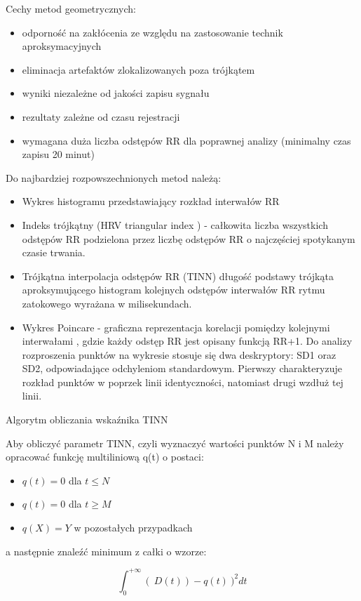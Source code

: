 \documentclass[a4paper, 11pt]{article}
\begin{document}
Cechy metod geometrycznych: 
\begin{itemize}
\item odporność na zakłócenia ze względu na zastosowanie technik aproksymacyjnych
\item eliminacja artefaktów zlokalizowanych poza trójkątem 
\item wyniki niezależne od jakości zapisu sygnału 
\item rezultaty zależne od czasu rejestracji 
\item wymagana duża liczba odstępów RR dla poprawnej analizy (minimalny
czas zapisu \textendash{} 20 minut) 
\end{itemize}
Do najbardziej rozpowszechnionych metod należą: 
\begin{itemize}
\item Wykres histogramu przedstawiający rozkład interwałów RR
\item Indeks trójkątny (HRV triangular index ) - całkowita liczba wszystkich
odstępów RR podzielona przez liczbę odstępów RR o najczęściej spotykanym
czasie trwania. 
\item Trójkątna interpolacja odstępów RR (TINN) \textendash{} długość podstawy
trójkąta aproksymującego histogram kolejnych odstępów interwałów RR
rytmu zatokowego wyrażana w milisekundach. 
\item Wykres Poincare - graficzna reprezentacja korelacji pomiędzy kolejnymi
interwałami , gdzie każdy odstęp RR jest opisany funkcją RR+1. Do
analizy rozproszenia punktów na wykresie stosuje się dwa deskryptory:
SD1 oraz SD2, odpowiadające odchyleniom standardowym. Pierwszy charakteryzuje
rozkład punktów w poprzek linii identyczności, natomiast drugi wzdłuż
tej linii.
\end{itemize}
Algorytm obliczania wskaźnika TINN

Aby obliczyć parametr TINN, czyli wyznaczyć wartości punktów N i M
należy opracować funkcję multiliniową q(t) o postaci:
\begin{itemize}
\item $q(t) = 0$ dla \ensuremath{t \le N}
\item $q(t) = 0$ dla \ensuremath{t \ge M} 
\item $q(X) = Y$ w pozostałych przypadkach
\end{itemize}
a następnie znaleźć minimum z całki o wzorze:

\begin{equation}
\int_{0}^{+\infty}\left(\: D(t)\right)-q(t)\:)^{2}dt
\end{equation}
\end{document}
